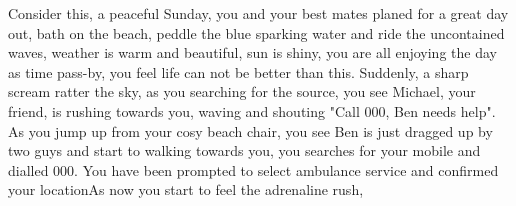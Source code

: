 Consider this, a peaceful Sunday, you and your best mates planed for a great day out, bath on the beach, peddle the blue sparking water and ride the uncontained waves, weather is warm and beautiful, sun is shiny, you are all enjoying the day as time pass-by, you feel life can not be better than this. Suddenly, a sharp scream ratter the sky, as you searching for the source, you see Michael, your friend, is rushing towards you, waving and shouting "Call 000, Ben needs help". As you jump up from your cosy beach chair, you see Ben is just dragged up by two guys and start to walking towards you, you searches for your mobile and dialled 000. You have been prompted to select ambulance service and confirmed your locationAs now you start to feel the adrenaline rush,  